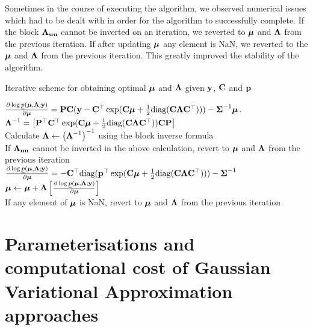 \documentclass{amsart}[12pt]
\begin{document}
			Sometimes in the course of  executing the algorithm, we observed numerical issues which had to be dealt
			with in order for the algorithm to successfully complete. If the block ${\boldsymbol \Lambda}_{{\bf u} {\bf u}}$ cannot be inverted on an
			iteration, we reverted to ${\boldsymbol \mu}$ and ${\boldsymbol \Lambda}$ from the previous iteration. If after updating ${\boldsymbol \mu}$
			any element is NaN, we reverted to the ${\boldsymbol \mu}$ and ${\boldsymbol \Lambda}$ from the previous iteration. This greatly
			improved the stability of the algorithm.
			
			\begin{algorithm}
				\caption[Algorithm GVA NR]{Iterative scheme for obtaining optimal ${\boldsymbol \mu}$ and ${\boldsymbol \Lambda}$
					given ${\bf y}$, ${\bf C}$ and ${\bf p}$}
				\label{alg:algorithm_nr}
				\begin{algorithmic}
					\REQUIRE $\frac{\partial \log \underline{p}({\boldsymbol \mu}, {\boldsymbol \Lambda}; {\bf y})}{\partial {\boldsymbol\mu}} = {\bf P} {\bf C} ({\bf y} - {\bf C}^\top \exp({\bf C} {\boldsymbol \mu} + \tfrac{1}{2} \text{diag}{({\bf C}{\boldsymbol\Lambda}{\bf C}^\top)})) - {\boldsymbol \Sigma}^{-1} {\boldsymbol \mu}$.
					\STATE ${\boldsymbol \Lambda}^{-1} = \left [ {\bf P}^\top {\bf C}^\top \exp({\bf C} {\boldsymbol \mu} + \tfrac{1}{2} \text{diag}({\bf C} {\boldsymbol \Lambda} {\bf C}^\top)) {\bf C} {\bf P} \right ]$ \\ [1ex]
					Calculate \STATE ${\boldsymbol \Lambda} \leftarrow \left ({\boldsymbol \Lambda}^{-1} \right )^{-1}$  using the block inverse formula \\ [1ex]
					If ${\boldsymbol \Lambda}_{{\bf u} {\bf u}}$ cannot be inverted in the above calculation, revert to ${\boldsymbol \mu}$ and ${\boldsymbol \Lambda}$ from the previous iteration \\ [1ex]
					\STATE $\frac{\partial \log \underline{p}({\boldsymbol \mu}, {\boldsymbol \Lambda}; {\bf y})}{\partial {\boldsymbol\mu}} = -{\bf C}^\top \text{diag}({\bf p}^\top \exp({\bf C} {\boldsymbol \mu} +\tfrac{1}{2} \text{diag}({\bf C} {\boldsymbol \Lambda} {\bf C}^\top))) - {\boldsymbol \Sigma}^{-1}$ \\ [1ex]
					\STATE ${\boldsymbol \mu} \leftarrow {\boldsymbol\mu} + {\boldsymbol \Lambda} \left [ \frac{\partial \log \underline{p}({\boldsymbol \mu}, {\boldsymbol \Lambda}; {\bf y})}{\partial {\boldsymbol\mu}} \right ]$ \\ [1ex]
					If any element of ${\boldsymbol \mu}$ is NaN, revert to ${\boldsymbol \mu}$ and ${\boldsymbol \Lambda}$ from the previous iteration
					\ENDWHILE
				\end{algorithmic}
			\end{algorithm}
					
					
			\section{Parameterisations and computational cost of Gaussian Variational Approximation approaches}
			\label{sec:param}
\end{document}
